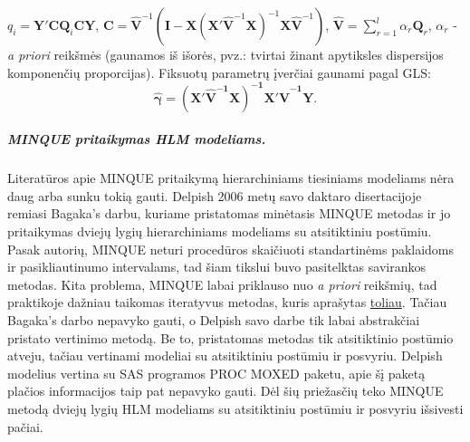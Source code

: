 \documentclass[12pt,a4paper]{article}
\begin{document}
\noindent $q_i=\mathbf{Y'CQ}_i\mathbf{CY}$, $\mathbf{C} = \mathbf{\hat{V}}^{-1}\left(\mathbf{I}-\mathbf{X}\left(\mathbf{X' \hat{V}}^{-1}\mathbf{X}\right)^{-1}\mathbf{X \hat{V}}^{-1}\right)$, $\mathbf{\hat{V}}=\sum^l_{r=1}\alpha_r\mathbf{Q}_r$, $\alpha_r$ - \textit{a priori} reikšmės (gaunamos iš išorės, pvz.: tvirtai žinant apytiksles dispersijos komponenčių proporcijas). Fiksuotų parametrų įverčiai gaunami pagal GLS\cite{rao1972}:
\[\boldsymbol{\hat{\gamma}}=\mathbf{\left(X'\hat{V}^{-1}X\right)^{-1}}\mathbf{X'\hat{V}^{-1}Y}.\]

\subparagraph{MINQUE pritaikymas HLM modeliams.} Literatūros apie MINQUE pritaikymą hierarchiniams tiesiniams modeliams nėra daug arba sunku tokią gauti. Delpish\cite{delpish} 2006 metų savo daktaro disertacijoje remiasi Bagaka's\cite{bagaka} darbu, kuriame pristatomas minėtasis MINQUE metodas ir jo pritaikymas dviejų lygių hierarchiniams modeliams su atsitiktiniu postūmiu. Pasak autorių, MINQUE neturi procedūros skaičiuoti standartinėms paklaidoms ir pasikliautinumo intervalams, tad šiam tikslui buvo pasitelktas savirankos metodas. Kita problema, MINQUE labai priklauso nuo \textit{a priori} reikšmių, tad praktikoje dažniau taikomas iteratyvus metodas, kuris aprašytas \hyperlink{iminque}{toliau}. Tačiau Bagaka's darbo nepavyko gauti, o Delpish savo darbe tik labai abstrakčiai pristato vertinimo metodą. Be to, pristatomas metodas tik atsitiktinio postūmio atveju, tačiau vertinami modeliai su atsitiktiniu postūmiu ir posvyriu. Delpish modelius vertina su SAS programos PROC MOXED paketu, apie šį paketą plačios informacijos taip pat nepavyko gauti. Dėl šių priežasčių teko MINQUE metodą dviejų lygių HLM modeliams su atsitiktiniu postūmiu ir posvyriu išsivesti pačiai.
\end{document}
